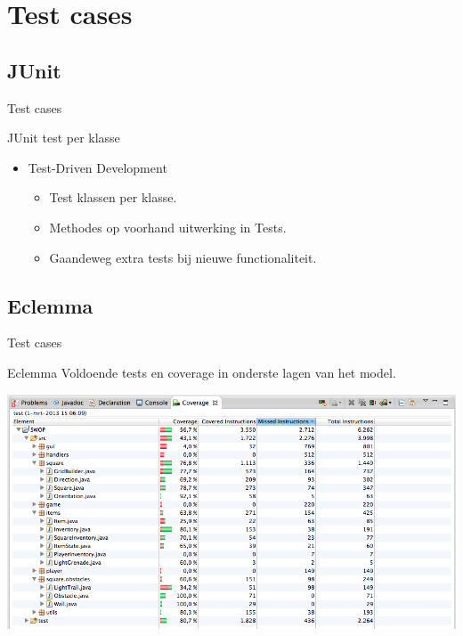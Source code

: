 \documentclass[t]{beamer}
\begin{document}
\section{Test cases}
\subsection{JUnit}
\begin{frame}{Test cases}
\begin{multicols}{2}
\tableofcontents[currentsection]
\end{multicols}
\end{frame}

\begin{frame}{JUnit test per klasse}
\begin{itemize}
	\item Test-Driven Development
	\begin{itemize}
		\item	Test klassen per klasse.
		\item	Methodes op voorhand uitwerking in Tests.
		\item	Gaandeweg extra tests bij nieuwe functionaliteit.
	\end{itemize}
\end{itemize}
\end{frame}

\subsection{Eclemma}
\begin{frame}{Test cases}
\begin{multicols}{2}
\tableofcontents[currentsection]
\end{multicols}
\end{frame}

\begin{frame}[plain]{Eclemma}
Voldoende tests en coverage in onderste lagen van het model.
\begin{center}
\includegraphics[width= 1\linewidth]{images/coverage.png}
\end{center}
\end{frame}
\end{document}

